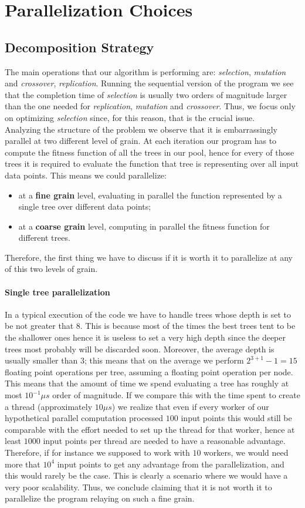 \documentclass[10pt]{article}
\numberwithin{equation}{section}
\begin{document}
\section{Parallelization Choices}
\subsection{Decomposition Strategy}
The main operations that our algorithm is performing are: \emph{selection}, \emph{mutation} and \emph{crossover}, \emph{replication}. Running the sequential version of the program we see that the completion time of \emph{selection} is usually two orders of magnitude larger than the one needed for \emph{replication}, \emph{mutation} and \emph{crossover}. Thus, we focus only on optimizing \emph{selection} since, for this reason, that is the crucial issue.\\
Analyzing the structure of the problem we observe that it is embarrassingly parallel at two different level of grain. At each iteration our program has to compute the fitness function of all the trees in our pool, hence for every of those trees it is required to evaluate the function that tree is representing over all input data points. This means we could parallelize:
\begin{itemize}
	\item at a \textbf{fine grain} level, evaluating in parallel the function represented by a single tree over different data points;
	\item at a \textbf{coarse grain} level, computing in parallel the fitness function for different trees.
\end{itemize}
Therefore, the first thing we have to discuss if it is worth it to parallelize at any of this two levels of grain.
\paragraph{Single tree parallelization}
In a typical execution of the code we have to handle trees whose depth is set to be not greater that $8$. This is because most of the times the best trees tent to be the shallower ones hence it is useless to set a very high depth since the deeper trees most probably will be discarded soon. Moreover, the average depth is usually smaller than $3$; this means that on the average we perform $2^{3+1}-1=15$ floating point operations per tree, assuming a floating point operation per node. This means that the amount of time we spend evaluating a tree has roughly at most $10^{-1}\mu$$s$ order of magnitude. If we compare this with the time spent to create a thread (approximately $10\mu$$s$) we realize that even if every worker of our hypothetical parallel computation processed $100$ input points this would still be comparable with the effort needed to set up the thread for that worker, hence at least $1000$ input points per thread are needed to have a reasonable advantage. Therefore, if for instance we supposed to work with $10$ workers, we would need more that $10^{4}$ input points to get any advantage from the parallelization, and this would rarely be the case. This is clearly a scenario where we would have a very poor scalability. Thus, we conclude claiming that it is not worth it to parallelize the program relaying on such a fine grain.
\end{document}

